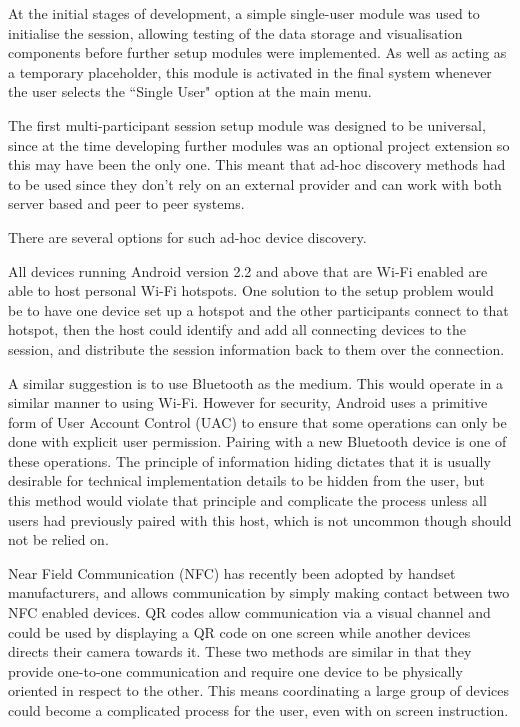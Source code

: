 At the initial stages of development, a simple single-user module was used to initialise the session, allowing testing of the data storage and visualisation components before further setup modules were implemented. As well as acting as a temporary placeholder, this module is activated in the final system whenever the user selects the ``Single User" option at the main menu.

The first multi-participant session setup module was designed to be universal, since at the time developing further modules was an optional project extension so this may have been the only one.
This meant that ad-hoc discovery methods had to be used since they don't rely on an external provider and can work with both server based and peer to peer systems.

There are several options for such ad-hoc device discovery.

All devices running Android version 2.2 and above that are Wi-Fi enabled are able to host personal Wi-Fi hotspots. One solution to the setup problem would be to have one device set up a hotspot and the other participants connect to that hotspot, then the host could identify and add all connecting devices to the session, and distribute the session information back to them over the connection.



A similar suggestion is to use Bluetooth as the medium. This would operate in a similar manner to using Wi-Fi. However for security, Android uses a primitive form of User Account Control (UAC) to ensure that some operations can only be done with explicit user permission. Pairing with a new Bluetooth device is one of these operations.\cite{androidAPI} The principle of information hiding dictates that it is usually desirable for technical implementation details to be hidden from the user, but this method would violate that principle and complicate the process unless all users had previously paired with this host, which is not uncommon though should not be relied on.

Near Field Communication (NFC) has recently been adopted by handset manufacturers, and allows communication by simply making contact between two NFC enabled devices.\cite{androidAPI} QR codes allow communication via a visual channel and could be used by displaying a QR code on one screen while another devices directs their camera towards it. These two methods are similar in that they provide one-to-one communication and require one device to be physically oriented in respect to the other. This means coordinating a large group of devices could become a complicated process for the user, even with on screen instruction.

